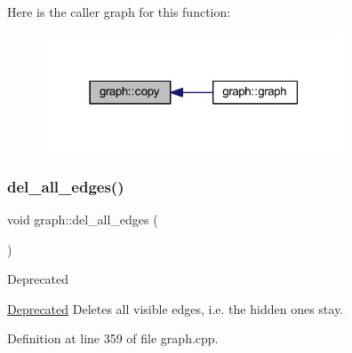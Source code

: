 Here is the caller graph for this function\+:\nopagebreak
\begin{figure}[H]
\begin{center}
\leavevmode
\includegraphics[width=255pt]{classgraph_abc39d65a6ca3f3165bc71c7125dfd22e_icgraph}
\end{center}
\end{figure}
\mbox{\label{classgraph_aae52be443c5aef001b5f6758855f15ad}} 
\subsubsection{\texorpdfstring{del\+\_\+all\+\_\+edges()}{del\_all\_edges()}}
{\footnotesize\ttfamily void graph\+::del\+\_\+all\+\_\+edges (\begin{DoxyParamCaption}{ }\end{DoxyParamCaption})}

\begin{DoxyRefDesc}{Deprecated}
\item[\mbox{\hyperlink{deprecated__deprecated000002}{Deprecated}}]Deletes all visible edges, i.\+e. the hidden ones stay. \end{DoxyRefDesc}


Definition at line 359 of file graph.\+cpp.


